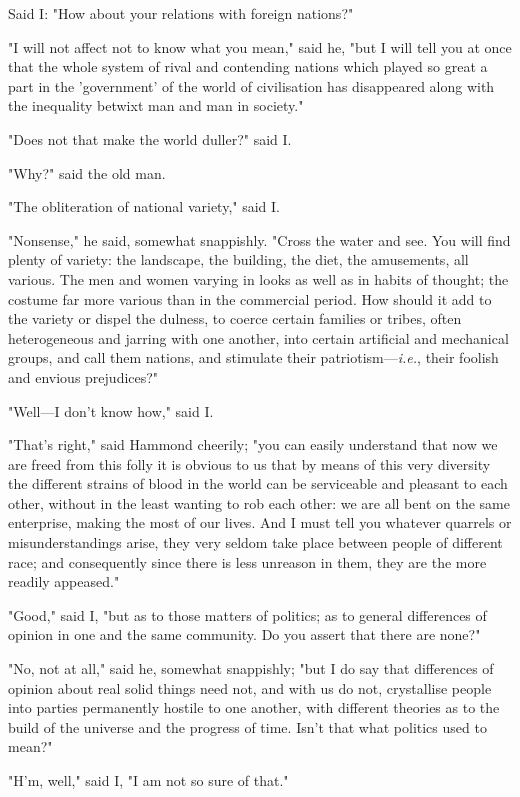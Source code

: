 Said I: "How about your relations with foreign nations?"

"I will not affect not to know what you mean," said he, "but I will tell
you at once that the whole system of rival and contending nations which
played so great a part in the 'government' of the world of civilisation
has disappeared along with the inequality betwixt man and man in
society."

"Does not that make the world duller?" said I.

"Why?" said the old man.

"The obliteration of national variety," said I.

"Nonsense," he said, somewhat snappishly. "Cross the water and see. You
will find plenty of variety: the landscape, the building, the diet, the
amusements, all various. The men and women varying in looks as well as
in habits of thought; the costume far more various than in the
commercial period. How should it add to the variety or dispel the
dulness, to coerce certain families or tribes, often heterogeneous and
jarring with one another, into certain artificial and mechanical groups,
and call them nations, and stimulate their patriotism---\emph{i.e.},
their foolish and envious prejudices?"

"Well---I don't know how," said I.

"That's right," said Hammond cheerily; "you can easily understand that
now we are freed from this folly it is obvious to us that by means of
this very diversity the different strains of blood in the world can be
serviceable and pleasant to each other, without in the least wanting to
rob each other: we are all bent on the same enterprise, making the most
of our lives. And I must tell you whatever quarrels or misunderstandings
arise, they very seldom take place between people of different race; and
consequently since there is less unreason in them, they are the more
readily appeased."

"Good," said I, "but as to those matters of politics; as to general
differences of opinion in one and the same community. Do you assert that
there are none?"

"No, not at all," said he, somewhat snappishly; "but I do say that
differences of opinion about real solid things need not, and with us do
not, crystallise people into parties permanently hostile to one another,
with different theories as to the build of the universe and the progress
of time. Isn't that what politics used to mean?"

"H'm, well," said I, "I am not so sure of that."

